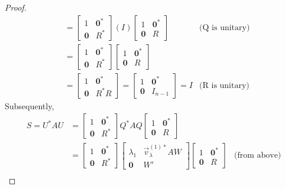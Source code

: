 \begin{proof}
\begin{align*}
&= \left[\begin{array}{cc}
1 & \textbf{0}^* \\
\textbf{0} & R^*
\end{array}\right]
(I)
\left[\begin{array}{cc}
1 & \textbf{0}^* \\
\textbf{0} & R
\end{array}\right] & \text{(Q is unitary)} \\
&= \left[\begin{array}{cc}
1 & \textbf{0}^* \\
\textbf{0} & R^*
\end{array}\right]
\left[\begin{array}{cc}
1 & \textbf{0}^* \\
\textbf{0} & R
\end{array}\right] \\
&=
\left[\begin{array}{cc}
1 & \textbf{0}^* \\
\textbf{0} & R^*R
\end{array}\right] 
=
\left[\begin{array}{cc}
1 & \textbf{0}^* \\
\textbf{0} & I_{n-1}
\end{array}\right] 
= I & \text{(R is unitary)}
\end{align*}
Subsequently,
\begin{align*}
S = U^*AU &= \left[\begin{array}{cc}
1 & \textbf{0}^* \\
\textbf{0} & R^*
\end{array}\right]
Q^* AQ 
\left[\begin{array}{cc}
1 & \textbf{0}^* \\
\textbf{0} & R
\end{array}\right] \\
&=
\left[\begin{array}{cc}
1 & \textbf{0}^* \\
\textbf{0} & R^*
\end{array}\right]
\left[\begin{array}{cc}
\lambda_1 & \vec{v}_\lambda^{(1)*}AW \\
\textbf{0} & W'
\end{array}\right]
\left[\begin{array}{cc}
1 & \textbf{0}^* \\
\textbf{0} & R
\end{array}\right] & \text{(from above)} \\

\end{align*}
\end{proof}
